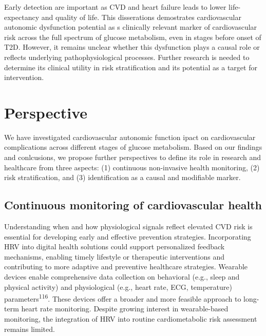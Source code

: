 \documentclass[
  a4paper,
  headsepline=true,
  open=any]{scrbook}
\begin{document}
Early detection are important as CVD and heart failure leads to lower
life-expectancy and quality of life. This disserations demostrates
cardiovascular autonomic dysfunction potential as s clinically relevant
marker of cardiovascular risk across the full spectrum of glucose
metabolism, even in stages before onset of T2D. However, it remains
unclear whether this dysfunction plays a causal role or reflects
underlying pathophysiological processes. Further research is needed to
determine its clinical utility in risk stratification and its potential
as a target for intervention.


\hypertarget{perspective}{%
\chapter{Perspective}\label{perspective}}

We have investigated cardiovascular autonomic function ipact on
cardiovascular complications across different stages of glucose
metabolism. Based on our findings and conlcusions, we propose further
perspectives to define its role in research and healthcare from three
aspects: (1) continuous non-invasive health monitoring, (2) risk
stratification, and (3) identification as a causal and modifiable
marker.

\hypertarget{continuous-monitoring-of-cardiovascular-health}{%
\section{Continuous monitoring of cardiovascular
health}\label{continuous-monitoring-of-cardiovascular-health}}

Understanding when and how physiological signals reflect elevated CVD
risk is essential for developing early and effective prevention
strategies. Incorporating HRV into digital health solutions could
support personalized feedback mechanisms, enabling timely lifestyle or
therapeutic interventions and contributing to more adaptive and
preventive healthcare strategies. Wearable devices enable comprehensive
data collection on behavioral (e.g., sleep and physical activity) and
physiological (e.g., heart rate, ECG, temperature)
parameters\textsuperscript{116}. These devices offer a broader and more
feasible approach to long-term heart rate monitoring. Despite growing
interest in wearable-based monitoring, the integration of HRV into
routine cardiometabolic risk assessment remains limited.
\end{document}
